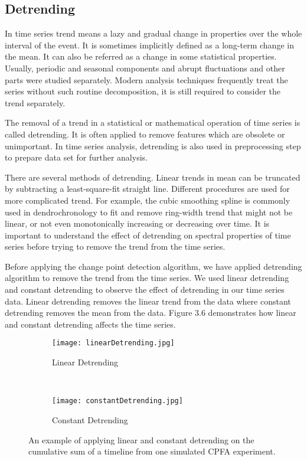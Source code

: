  \subsection{\label{Detrending}Detrending}
 In time series trend means a lazy and gradual change in properties over the whole interval of the event. It is sometimes implicitly defined as a long-term change in the mean. It can also be referred as a change in some statistical properties. Usually, periodic and seasonal components and abrupt fluctuations and other parts were studied separately. Modern analysis techniques frequently treat the series without such routine decomposition, it is still required to consider the trend separately.\par 
 The removal of a trend in a statistical or mathematical operation of time series is called detrending. It is often applied to remove features which are obsolete or unimportant. In time series analysis, detrending is also used in preprocessing step to prepare data set for further analysis.\par 
 There are several methods of detrending. Linear trends in mean can be truncated by subtracting a least-square-fit straight line. Different procedures are used for more complicated trend. For example, the cubic smoothing spline is commonly used in dendrochronology to fit and remove ring-width trend that might not be linear, or not even monotonically increasing or decreasing over time. It is important to understand the effect of detrending on spectral properties of time series before trying to remove the trend from the time series.\par 
 Before applying the change point detection algorithm, we have applied detrending algorithm to remove the trend from the time series. We used linear detrending and constant detrending to observe the effect of detrending in our time series data. Linear detrending removes the linear trend from the data where constant detrending removes the mean from the data. Figure $3.6$ demonstrates how linear and constant detrending affects the time series.\par
 \begin{figure}[h]
 	\begin{subfigure}{\textwidth}
 		\centering
 		\texttt{[image: linearDetrending.jpg]}
 		\caption{Linear Detrending}
 		\label{fig:Linear}
 	\end{subfigure}%
 \\
 	\begin{subfigure}{\textwidth}
 		\centering
 		\texttt{[image: constantDetrending.jpg]}
 		\caption{Constant Detrending}
 		\label{fig:Constant}
 	\end{subfigure}
 	\caption{An example of applying linear and constant detrending on the cumulative sum of a timeline from one simulated CPFA experiment.}
 	\label{fig:fig}
 \end{figure}
